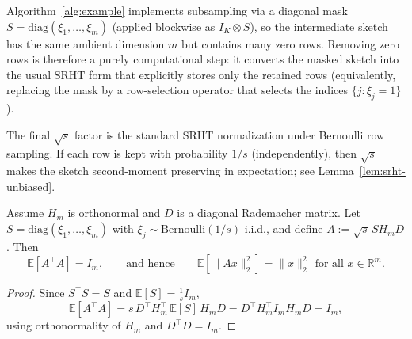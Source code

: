 \begin{remark}
\label{rem:postprocess}
Algorithm~\ref{alg:example} implements subsampling via a diagonal mask
$S=\mathrm{diag}(\xi_1,\dots,\xi_m)$ (applied blockwise as $I_K\otimes S$),
so the intermediate sketch has the same ambient dimension $m$ but contains many
zero rows.  Removing zero rows is therefore a purely computational step:
it converts the masked sketch into the usual SRHT form that explicitly stores
only the retained rows (equivalently, replacing the mask by a row-selection operator
that selects the indices $\{j:\xi_j=1\}$).

The final $\sqrt{s}$ factor is the standard SRHT normalization under Bernoulli
row sampling.  If each row is kept with probability $1/s$ (independently), then
$\sqrt{s}$ makes the sketch second-moment preserving in expectation; see
Lemma~\ref{lem:srht-unbiased}.
\end{remark}

\begin{lemma}
\label{lem:srht-unbiased}
Assume $H_m$ is orthonormal and $D$ is a diagonal Rademacher matrix.
Let $S=\mathrm{diag}(\xi_1,\dots,\xi_m)$ with $\xi_j\sim\mathrm{Bernoulli}(1/s)$ i.i.d.,
and define $A := \sqrt{s}\, S H_m D$.  Then
\[
\mathbb{E}\!\left[A^\top A\right] = I_m,
\qquad\text{and hence}\qquad
\mathbb{E}\!\left[\|A x\|_2^2\right] = \|x\|_2^2 \ \ \text{for all } x\in\mathbb{R}^m.
\]
\end{lemma}

\begin{proof}
Since $S^\top S=S$ and $\mathbb{E}[S]=\frac{1}{s}I_m$,
\[
\mathbb{E}[A^\top A]
= s\, D^\top H_m^\top \,\mathbb{E}[S]\, H_m D
= D^\top H_m^\top I_m H_m D
= I_m,
\]
using orthonormality of $H_m$ and $D^\top D=I_m$.
\end{proof}
